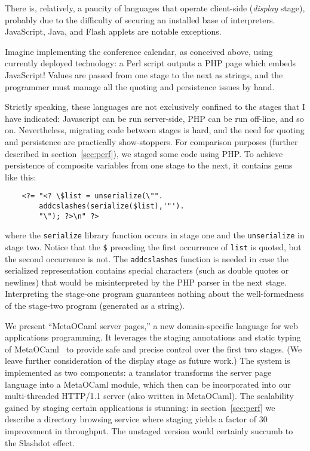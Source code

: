 \documentclass{elsart}
\def\MOC{MetaOCaml\xspace}
\begin{document}
There is, relatively, a paucity of languages that operate client-side
(\emph{display} stage), probably due to the difficulty of securing an
installed base of interpreters.  JavaScript, Java, and Flash applets are
notable exceptions.  

Imagine implementing the conference calendar, as conceived
above, using currently deployed technology: a Perl script
outputs a PHP page which embeds JavaScript!  Values are
passed from one stage to the next as strings, and the
programmer must manage all the quoting and persistence
issues by hand.

Strictly speaking, these languages are not exclusively confined to the
stages that I have indicated: Javascript can be run server-side, PHP
can be run off-line, and so on.  Nevertheless, migrating code between
stages is hard, and the need for quoting and persistence are
practically show-stoppers.  For comparison purposes (further described
in section~\ref{sec:perf}), we staged some code using PHP.  To achieve
persistence of composite variables from one stage to the next, it
contains gems like this:\label{php-gem}
\begin{verbatim}
    <?= "<? \$list = unserialize(\"".
        addcslashes(serialize($list),'"').
        "\"); ?>\n" ?>
\end{verbatim}
where the \texttt{serialize} library function occurs in stage one and
the \texttt{unserialize} in stage two.  Notice that the \verb+$+
preceding the first occurrence of \verb+list+ is quoted, but the
second occurrence is not.  The \texttt{addcslashes} function is needed
in case the serialized representation contains special characters
(such as double quotes or newlines) that would be misinterpreted by
the PHP parser in the next stage.  Interpreting the stage-one program
guarantees nothing about the well-formedness of the stage-two program
(generated as a string).

We present ``\MOC server pages,'' a new domain-specific language for
web applications programming.  It leverages the staging annotations
and static typing of \MOC~\cite{calcagno03meta,taha00metaml} to
provide safe and precise control over the first two stages.  (We leave
further consideration of the display stage as future work.)  The
system is implemented as two components: a translator transforms the
server page language into a \MOC module, which then can be
incorporated into our multi-threaded HTTP/1.1 server (also written in
\MOC).  The scalability gained by staging certain applications is
stunning: in section~\ref{sec:perf} we describe a directory browsing
service where staging yields a factor of 30 improvement in throughput.
The unstaged version would certainly succumb to the Slashdot effect.
\end{document}
